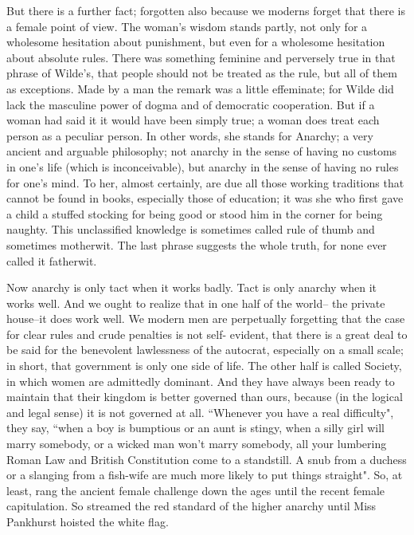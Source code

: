 \documentclass[final,10pt,letterpaper,twocolumn,openany]{book}
\begin{document}
     But there is a further fact; forgotten also because we moderns forget
that there is a female point of view. The woman's wisdom stands partly,
not only for a wholesome hesitation about punishment, but even for a
wholesome hesitation about absolute rules. There was something feminine
and perversely true in that phrase of Wilde's, that people should not be
treated as the rule, but all of them as exceptions. Made by a man the
remark was a little effeminate; for Wilde did lack the masculine power of
dogma and of democratic cooperation. But if a woman had said it it would
have been simply true; a woman does treat each person as a peculiar
person. In other words, she stands for Anarchy; a very ancient and
arguable philosophy; not anarchy in the sense of having no customs in
one's life (which is inconceivable), but anarchy in the sense of having no
rules for one's mind. To her, almost certainly, are due all those working
traditions that cannot be found in books, especially those of education; it
was she who first gave a child a stuffed stocking for being good or stood
him in the corner for being naughty. This unclassified knowledge is
sometimes called rule of thumb and sometimes motherwit. The last phrase
suggests the whole truth, for none ever called it fatherwit.

Now anarchy is only tact when it works badly. Tact is only anarchy
when it works well. And we ought to realize that in one half of the world--
the private house--it does work well. We modern men are perpetually
forgetting that the case for clear rules and crude penalties is not self-
evident, that there is a great deal to be said for the benevolent lawlessness
of the autocrat, especially on a small scale; in short, that government is
only one side of life. The other half is called Society, in which women are
admittedly dominant. And they have always been ready to maintain that
their kingdom is better governed than ours, because (in the logical and
legal sense) it is not governed at all. ``Whenever you have a real
difficulty", they say, ``when a boy is bumptious or an aunt is stingy, when a
silly girl will marry somebody, or a wicked man won't marry somebody,
all your lumbering Roman Law and British Constitution come to a
standstill. A snub from a duchess or a slanging from a fish-wife are much
more likely to put things straight". So, at least, rang the ancient female
challenge down the ages until the recent female capitulation. So streamed
the red standard of the higher anarchy until Miss Pankhurst hoisted the
white flag.
\end{document}
